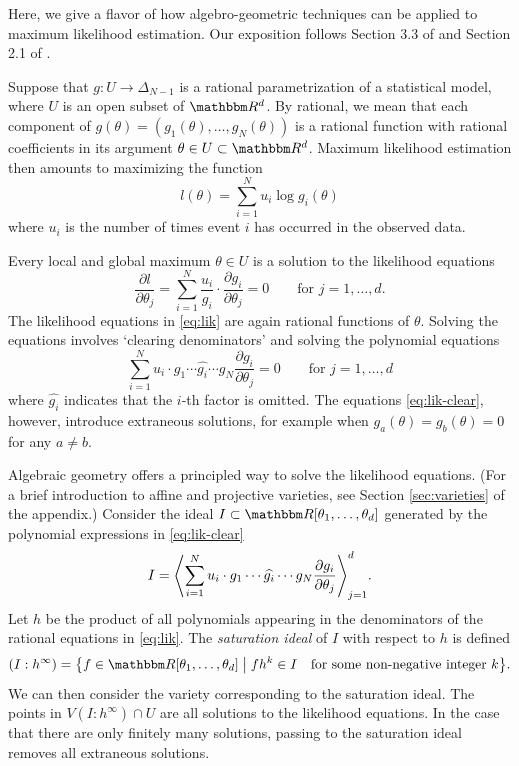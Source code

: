 \documentclass[11pt,titlepage]{article}
\numberwithin{equation}{section}
\begin{document}
    Here, we give a flavor of how algebro-geometric techniques can be applied to
    maximum likelihood estimation.  Our exposition follows Section 3.3 of
    \cite{ASCB} and Section 2.1 of \cite{DSS08}.

    Suppose that $g: U \to \Delta_{N-1}$ is a rational parametrization of a
    statistical model, where $U$ is an open subset of $\R^d$.  By rational, we
    mean that each component of $g(\theta) = (g_1(\theta), \ldots, g_N(\theta))$
    is a rational function with rational coefficients in its argument $\theta
    \in U \subset \R^d$.  Maximum likelihood estimation then amounts to
    maximizing the function
    \[
        l(\theta) = \sum_{i=1}^N u_i \log g_i(\theta)
    \] 
    where $u_i$ is the number of times event $i$ has occurred in the observed
    data.

    Every local and global maximum $\theta \in U$ is a solution to the
    likelihood equations
    \begin{equation}\label{eq:lik}
        \frac{\partial l}{\partial\theta_j}
        =
        \sum_{i=1}^N 
        \frac{u_i}{g_i} 
        \cdot
        \frac{\partial g_i}{\partial \theta_j}
        = 0
        \qquad
        \text{for $j = 1,\ldots,d$}.
    \end{equation}
    The likelihood equations in \eqref{eq:lik} are again rational functions of
    $\theta$.  Solving the equations involves `clearing denominators' and
    solving the polynomial equations
    \begin{equation}\label{eq:lik-clear}
        \sum_{i=1}^N 
        u_i \cdot g_1 \cdots \widehat{g_i} \cdots g_N
        \frac{\partial g_i}{\partial \theta_j}
        = 0
        \qquad
        \text{for $j = 1, \ldots, d$}
    \end{equation}
    where $\widehat{g_i}$ indicates that the $i$-th factor is omitted.  The
    equations \eqref{eq:lik-clear}, however, introduce extraneous solutions, for
    example when $g_a(\theta) = g_b(\theta) = 0$ for any $a \ne b$.

    Algebraic geometry offers a principled way to solve the likelihood
    equations.  (For a brief introduction to affine and projective varieties, see
    Section \ref{sec:varieties} of the appendix.)  Consider the ideal $I \subset \R[\theta_1,
    \ldots, \theta_d]$ generated by the polynomial expressions in \eqref{eq:lik-clear}
    \[
        I = \adil[\Bigg]{
            \sum_{i=1}^N u_i \cdot g_1 \cdots \widehat{g_i} \cdots g_N
            \frac{\partial g_i}{\partial \theta_j}
        }_{j=1}^d
        .
    \]
    Let $h$ be the product of all polynomials appearing in the denominators of
    the rational equations in \eqref{eq:lik}.  The \emph{saturation ideal} of
    $I$ with respect to $h$ is defined
    \[
        (I : h^\infty) = \cdil[\big]{
            f \in \R[\theta_1, \ldots, \theta_d]
            \;\big\vert\;
            fh^k \in I
            \quad
            \text{for some non-negative integer $k$}
        }.
    \]
    We can then consider the variety corresponding to the saturation ideal.  The
    points in $V(I : h^\infty) \cap U$ are all solutions to the likelihood
    equations.  In the case that there are only finitely many solutions, passing
    to the saturation ideal removes all extraneous solutions.
\end{document}
